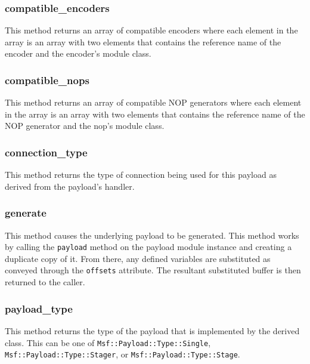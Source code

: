 \documentclass{report}
\begin{document}
            \subsubsection{compatible\_encoders}

\par
This method returns an array of compatible encoders where each
element in the array is an array with two elements that contains the
reference name of the encoder and the encoder's module class.

            \subsubsection{compatible\_nops}

\par
This method returns an array of compatible NOP generators where each
element in the array is an array with two elements that contains the
reference name of the NOP generator and the nop's module class.

            \subsubsection{connection\_type}

\par
This method returns the type of connection being used for this
payload as derived from the payload's handler.

            \subsubsection{generate}

\par
This method causes the underlying payload to be generated.  This
method works by calling the \texttt{payload} method on the payload
module instance and creating a duplicate copy of it.  From there,
any defined variables are substituted as conveyed through the
\texttt{offsets} attribute.  The resultant substituted buffer is
then returned to the caller.

            \subsubsection{payload\_type}

\par
This method returns the type of the payload that is implemented by
the derived class.  This can be one of
\texttt{Msf::Payload::Type::Single},
\texttt{Msf::Payload::Type::Stager}, or
\texttt{Msf::Payload::Type::Stage}.
\end{document}
